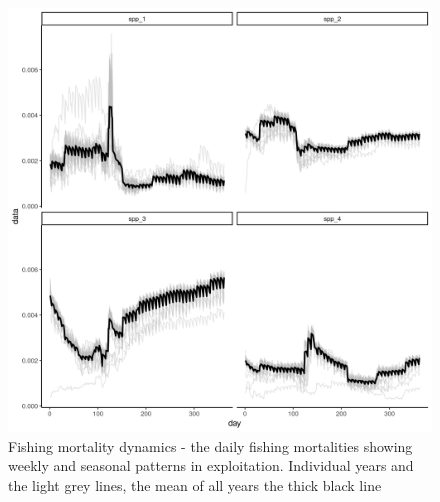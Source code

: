 \documentclass[review]{elsarticle}
\begin{document}
\begin{figure}[!ht]
	\includegraphics[width = \linewidth]{Plots/f_dynamics}
	\caption{Fishing mortality dynamics - the daily fishing mortalities
		showing weekly and seasonal patterns in exploitation.
		Individual years and the light grey lines, the mean of all
		years the thick black line}
	\label{fig:10}
\end{figure}	
\end{document}

